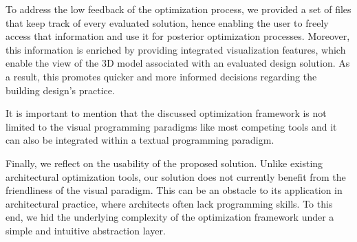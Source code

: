 To address the low feedback of the optimization process, we provided a set of files that keep track of every evaluated solution, hence enabling the user to freely access that information and use it for posterior optimization processes. Moreover, this information is enriched by providing integrated visualization features, which enable the view of the 3D model associated with an evaluated design solution. As a result, this promotes quicker and more informed decisions regarding the building design's practice.

It is important to mention that the discussed optimization framework is not limited to the visual programming paradigms like most competing tools and it can also be integrated within a textual programming paradigm. %

Finally, we reflect on the usability of the proposed solution. Unlike existing architectural optimization tools, our solution does not currently benefit from the friendliness of the visual paradigm. This can be an obstacle to its application in architectural practice, where architects often lack programming skills. To this end, we hid the underlying complexity of the optimization framework under a simple and intuitive abstraction layer. 

